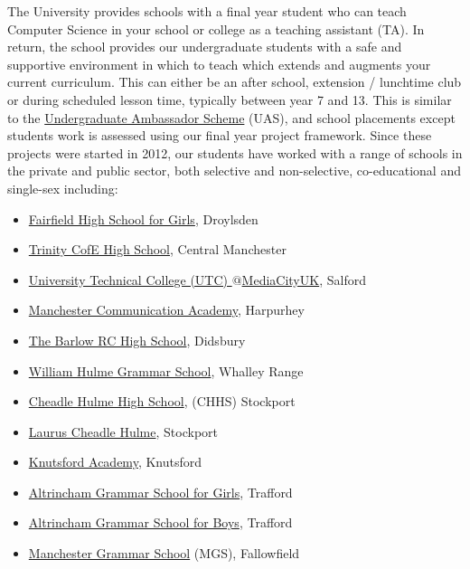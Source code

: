 \documentclass[
  12pt,
]{book}
\providecommand{\tightlist}{%
  \setlength{\itemsep}{0pt}\setlength{\parskip}{0pt}}
\begin{document}
The University provides schools with a final year student who can teach Computer Science in your school or college as a teaching assistant (TA). In return, the school provides our undergraduate students with a safe and supportive environment in which to teach which extends and augments your current curriculum. This can either be an after school, extension / lunchtime club or during scheduled lesson time, typically between year 7 and 13. This is similar to the \href{https://en.wikipedia.org/wiki/Undergraduate_Ambassadors_Scheme}{Undergraduate Ambassador Scheme} (UAS), \citep{uas, Cooper2005} and school placements \citep{Moller2019} except students work is assessed using our final year project framework. \citep{COMP30030, COMP30040} Since these projects were started in 2012, our students have worked with a range of schools in the private and public sector, both selective and non-selective, co-educational and single-sex including:

\begin{itemize}
\tightlist
\item
  \href{http://www.fairfieldhigh.tameside.sch.uk/}{Fairfield High School for Girls}, Droylsden
\item
  \href{https://www.trinityhigh.com}{Trinity CofE High School}, Central Manchester
\item
  \href{http://www.utcmediacityuk.org.uk/}{University Technical College (UTC) \(@\)MediaCityUK}, Salford
\item
  \href{https://www.manchestercommunicationacademy.com/}{Manchester Communication Academy}, Harpurhey\\
\item
  \href{https://thebarlowrchigh.co.uk/}{The Barlow RC High School}, Didsbury
\item
  \href{https://www.whgs-academy.org/}{William Hulme Grammar School}, Whalley Range
\item
  \href{https://www.chhs.org.uk/}{Cheadle Hulme High School}, (CHHS) Stockport
\item
  \href{https://www.lauruscheadlehulme.org.uk/}{Laurus Cheadle Hulme}, Stockport
\item
  \href{https://www.knutsfordacademy.org.uk/}{Knutsford Academy}, Knutsford
\item
  \href{http://www.aggs.trafford.sch.uk/}{Altrincham Grammar School for Girls}, Trafford
\item
  \href{https://www.agsb.co.uk/}{Altrincham Grammar School for Boys}, Trafford
\item
  \href{https://www.mgs.org/}{Manchester Grammar School} (MGS), Fallowfield
\end{itemize}
\end{document}
